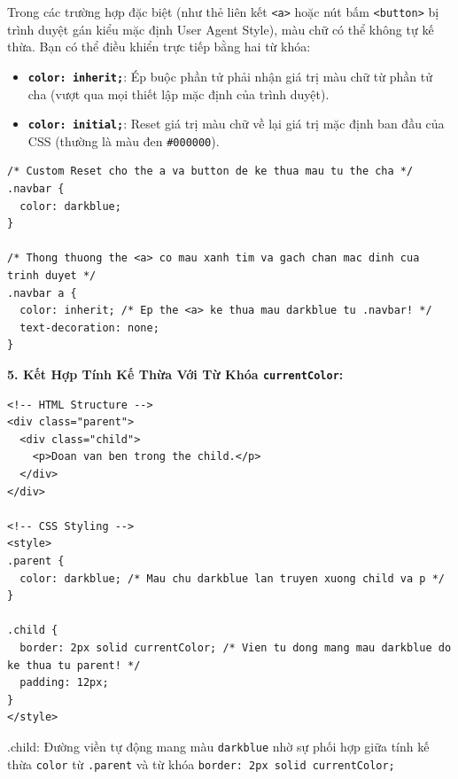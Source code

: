 \documentclass[11pt,oneside]{book}
\newcommand{\codeinline}[1]{\textcolor{accentOrange}{\texttt{#1}}}
\begin{document}
\begin{conceptBox}
Trong các trường hợp đặc biệt (như thẻ liên kết \codeinline{<a>} hoặc nút bấm \codeinline{<button>} bị trình duyệt gán kiểu mặc định User Agent Style), màu chữ có thể không tự kế thừa. Bạn có thể điều khiển trực tiếp bằng hai từ khóa:
\begin{itemize}[leftmargin=1.5em, itemsep=3pt, parsep=0pt]
    \item \textbf{\codeinline{color: inherit;}}: Ép buộc phần tử phải nhận giá trị màu chữ từ phần tử cha (vượt qua mọi thiết lập mặc định của trình duyệt).
    \item \textbf{\codeinline{color: initial;}}: Reset giá trị màu chữ về lại giá trị mặc định ban đầu của CSS (thường là màu đen \codeinline{\#000000}).
\end{itemize}
\end{conceptBox}

\begin{codeWindow}
\begin{lstlisting}[language=CSS3]
/* Custom Reset cho the a va button de ke thua mau tu the cha */
.navbar {
  color: darkblue;
}

/* Thong thuong the <a> co mau xanh tim va gach chan mac dinh cua trinh duyet */
.navbar a {
  color: inherit; /* Ep the <a> ke thua mau darkblue tu .navbar! */
  text-decoration: none;
}
\end{lstlisting}
\end{codeWindow}

\textbf{5. Kết Hợp Tính Kế Thừa Với Từ Khóa \codeinline{currentColor}:}

\begin{codeWindow}
\begin{lstlisting}[language=HTML5]
<!-- HTML Structure -->
<div class="parent">
  <div class="child">
    <p>Doan van ben trong the child.</p>
  </div>
</div>

<!-- CSS Styling -->
<style>
.parent {
  color: darkblue; /* Mau chu darkblue lan truyen xuong child va p */
}

.child {
  border: 2px solid currentColor; /* Vien tu dong mang mau darkblue do ke thua tu parent! */
  padding: 12px;
}
</style>
\end{lstlisting}
\end{codeWindow}

\begin{browserWindow}
\vspace{2pt}
\begin{tcolorbox}[
    enhanced,
    colback=blue!5,
    colframe=blue!80!black,
    arc=6pt, boxrule=1.5pt,
    top=8pt, bottom=8pt, left=10pt, right=10pt,
    fontupper=\sffamily\bfseries\color{blue!80!black}
]
  .child: Đường viền tự động mang màu \codeinline{darkblue} nhờ sự phối hợp giữa tính kế thừa \codeinline{color} từ \codeinline{.parent} và từ khóa \codeinline{border: 2px solid currentColor;}
\end{tcolorbox}
\end{browserWindow}
\end{document}
